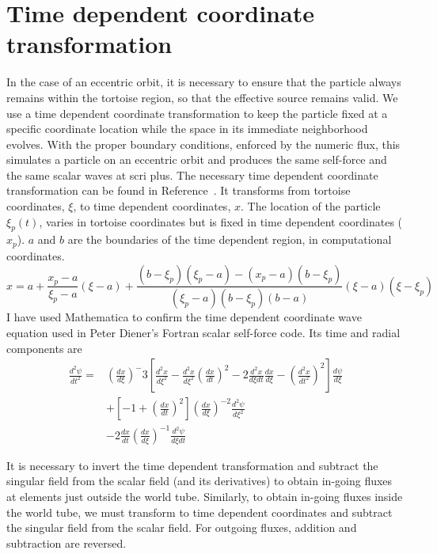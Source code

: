 \section{Time dependent coordinate transformation}

In the case of an eccentric orbit, it is necessary to ensure that the particle always remains within the tortoise region, so that the effective source remains valid. We use a time dependent coordinate transformation to keep the particle fixed at a specific coordinate location while the space in its immediate neighborhood evolves. With the proper boundary conditions, enforced by the numeric flux, this simulates a particle on an eccentric orbit and produces the same self-force and the same scalar waves at scri plus. The necessary time dependent coordinate transformation can be found in Reference~\cite{time_dependent_coordinate_transformation}. It transforms from tortoise coordinates, $\xi$, to time dependent coordinates, $x$. The location of the particle $\xi_p(t)$, varies in tortoise coordinates but is fixed in time dependent coordinates ($x_p$). $a$ and $b$ are the boundaries of the time dependent region, in computational coordinates. 
\begin{equation}
  x=a+\frac{x_p-a}{\xi_p-a}(\xi-a)+\frac{(b-\xi_p)(\xi_p-a)-(x_p-a)(b-\xi_p)}{(\xi_p-a)(b-\xi_p)(b-a)}(\xi-a)(\xi-\xi_p)
\end{equation}
I have used Mathematica to confirm the time dependent coordinate wave equation used in Peter Diener's Fortran scalar self-force code. Its time and radial components are
\begin{eqnarray}
\frac{d^2\psi}{dt^2}=&(\frac{dx}{d\xi})^-3[\frac{d^2x}{d\xi^2}-\frac{d^2x}{d\xi^2}(\frac{dx}{dt})^2-2\frac{d^2x}{d\xi dt}\frac{dx}{d\xi}-(\frac{d^2x}{dt^2})^2]\frac{d\psi}{d\xi}\nonumber\\
&+[-1+(\frac{dx}{dt})^2](\frac{dx}{d\xi})^{-2}\frac{d^2\psi}{d\xi^2}\nonumber\\
&-2\frac{dx}{dt}(\frac{dx}{d\xi})^{-1}\frac{d^2\psi}{d\xi dt}
\end{eqnarray}

It is necessary to invert the time dependent transformation and subtract the singular field from the scalar field (and its derivatives) to obtain in-going fluxes at elements just outside the world tube. Similarly, to obtain in-going fluxes inside the world tube, we must transform to time dependent coordinates and subtract the singular field from the scalar field. For outgoing fluxes, addition and subtraction are reversed. 


